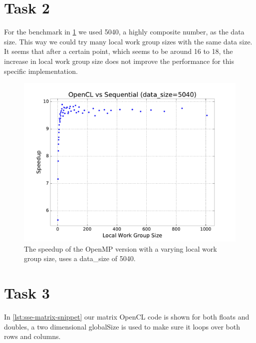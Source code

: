 \documentclass[final]{report}
\begin{document}
\section{Task 2}
For the benchmark in \cref{fig:opencl-localsize-sweep} we used 5040, a highly composite number, as the data size.
This way we could try many local work group sizes with the same data size.
It seems that after a certain point, which seems to be around 16 to 18, the increase in local work group size does not improve the performance for this specific implementation.
\begin{figure}[H]
\centering
    \includegraphics[width=\linewidth]{resources/opencl-localsize-sweep.pdf}
    \caption{The speedup of the OpenMP version with a varying local work group size, uses a data\_size of 5040.}
    \label{fig:opencl-localsize-sweep}
\end{figure}
\section{Task 3}
In \cref{lst:sse-matrix-snippet} our matrix OpenCL code is shown for both floats and doubles, a two dimensional globalSize is used to make sure it loops over both rows and columns.

\end{document}
